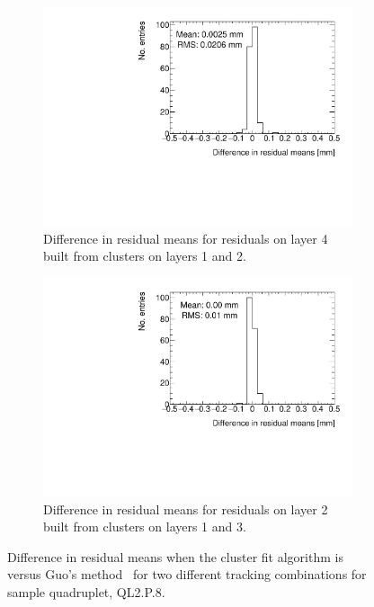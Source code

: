 \begin{figure}
  \centering
    \begin{subfigure}{.45\textwidth}
      \centering
      \includegraphics[width=\linewidth]{figures/compare_residual_fits_QL2P08_3100V_2021-06-18_no_dnl_minus_QL2P08_3100V_2021-07-21_no_reclustering_layer4_fixedlayers12.pdf}
      \caption{Difference in residual means for residuals on layer 4 built from clusters on layers 1 and 2.}
      \label{fig:cluster_fit_res_mean_compare_fits_412}
    \end{subfigure}\hfill
    \begin{subfigure}{.45\textwidth}
      \centering
      \includegraphics[width=\linewidth]{figures/figure_compare_residual_fits_QL2P08_3100V_2021-06-18_no_dnl_minus_QL2P08_3100V_2021-07-21_no_reclustering_layer2_fixedlayers13.pdf}
      \caption{Difference in residual means for residuals on layer 2 built from clusters on layers 1 and 3.}
      \label{fig:cluster_fit_res_mean_compare_fits_213}
    \end{subfigure}\hfill
  \caption{Difference in residual means when the cluster fit algorithm is ~\cite{hatlo_developments_2005} versus Guo's method~\cite{guo_simple_2011} for two different tracking combinations for sample quadruplet, QL2.P.8.}
  \label{fig:cluster_fit_res_mean_compare_fits}
\end{figure}


